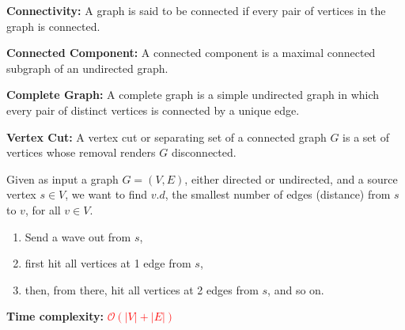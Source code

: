 \documentclass[a4paper,landscape]{article}
\newcommand{\timecomplexity}[1]{\textcolor{red}{#1}}
\newcommand{\bigo}{\mathcal{O}}
\begin{document}
\begin{multicols}{7}
\textbf{Connectivity:} A graph is said to be connected if every pair of vertices in the graph is connected.



\textbf{Connected Component:} A connected component is a maximal connected subgraph of an undirected graph.



\textbf{Complete Graph:} A complete graph is a simple undirected graph in which every pair of distinct vertices is connected by a unique edge.



\textbf{Vertex Cut:} A vertex cut or separating set of a connected graph $G$ is a set of vertices whose removal renders $G$ disconnected.
\endtcolorbox

\tcolorbox[mybox={Breadth-First Search}]
Given as input a graph $G = (V, E)$, either directed or undirected, and a source
vertex $s \in V$, we want to find $v.d$, the smallest number of edges (distance)
from $s$ to $v$, for all $v \in V$.

\begin{enumerate}[noitemsep, topsep=0pt]
    \item Send a wave out from $s$,
    \item first hit all vertices at 1 edge from $s$,
    \item then, from there, hit all vertices at 2 edges from $s$, and so on.
\end{enumerate}

\noindent %
\textbf{Time complexity:} \timecomplexity{\(\bigo(|V| + |E|)\)} \quad
\endtcolorbox


\end{multicols}
\end{document}

